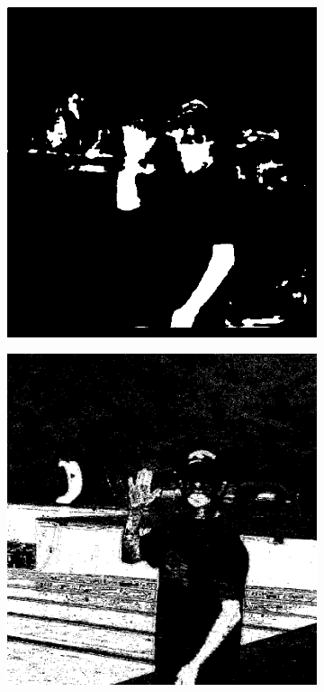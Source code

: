 \begin{figure}[h]
\begin{subfigure}[b]{0.18\textwidth}
     \end{subfigure}
    \hfill
     \begin{subfigure}[b]{0.18\textwidth}
         \centering
         \includegraphics[width=\textwidth]{images/results/base_st/wd2002-sue-shaded-hat_skinny_22.png}
     \end{subfigure}
    \hfill
     \begin{subfigure}[b]{0.18\textwidth}
         \centering
         \includegraphics[width=\textwidth]{images/results/base_st/wd2002-sue-shaded-hat_bayes.png}

\end{subfigure}
\end{figure}
